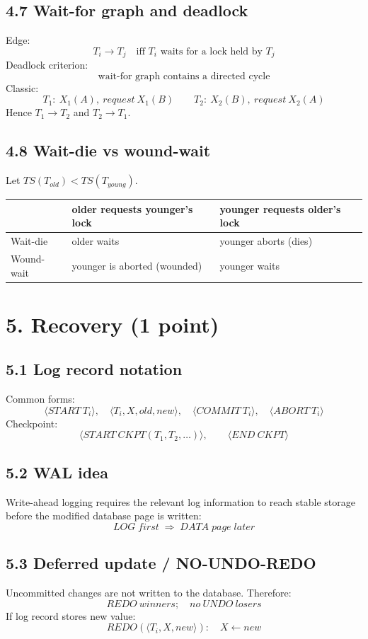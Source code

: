 \documentclass[10pt,a4paper]{article}
\begin{document}
\subsection{4.7 Wait-for graph and deadlock}
Edge:
\[
T_i\to T_j \quad\text{iff }T_i\text{ waits for a lock held by }T_j
\]
Deadlock criterion:
\[
\boxed{\text{wait-for graph contains a directed cycle}}
\]
Classic:
\[
T_1:\ X_1(A),\ request\ X_1(B)\qquad
T_2:\ X_2(B),\ request\ X_2(A)
\]
Hence $T_1\to T_2$ and $T_2\to T_1$.

\subsection{4.8 Wait-die vs wound-wait}
Let $TS(T_{old})<TS(T_{young})$.
\begin{center}
\begin{tabularx}{\textwidth}{p{3cm} X X}
\toprule
 & older requests younger's lock & younger requests older's lock\\
\midrule
Wait-die & older waits & younger aborts (dies)\\
Wound-wait & younger is aborted (wounded) & younger waits\\
\bottomrule
\end{tabularx}
\end{center}

\section{5. Recovery (1 point)}

\subsection{5.1 Log record notation}
Common forms:
\[
\langle START\ T_i\rangle,\quad
\langle T_i,X,old,new\rangle,\quad
\langle COMMIT\ T_i\rangle,\quad
\langle ABORT\ T_i\rangle
\]
Checkpoint:
\[
\langle START\ CKPT(T_1,T_2,\ldots)\rangle,\qquad
\langle END\ CKPT\rangle
\]

\subsection{5.2 WAL idea}
Write-ahead logging requires the relevant log information to reach stable storage before the modified database page is written:
\[
\boxed{LOG\;first\;\Rightarrow\;DATA\;page\;later}
\]

\subsection{5.3 Deferred update / NO-UNDO-REDO}
Uncommitted changes are not written to the database. Therefore:
\[
\boxed{REDO\ winners;\quad no\ UNDO\ losers}
\]
If log record stores new value:
\[
REDO(\langle T_i,X,new\rangle):\quad X\leftarrow new
\]
\end{document}
